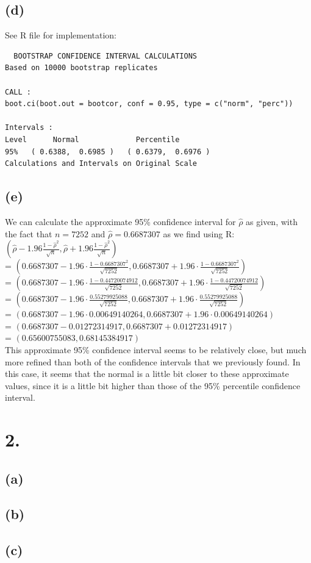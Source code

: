 \documentclass{article}
\begin{document}
{\subsection*{(d)}

See R file for implementation: \\ 
\begin{verbatim}
  BOOTSTRAP CONFIDENCE INTERVAL CALCULATIONS
Based on 10000 bootstrap replicates

CALL : 
boot.ci(boot.out = bootcor, conf = 0.95, type = c("norm", "perc"))

Intervals : 
Level      Normal             Percentile     
95%   ( 0.6388,  0.6985 )   ( 0.6379,  0.6976 )  
Calculations and Intervals on Original Scale
\end{verbatim}

\subsection*{(e)}

We can calculate the approximate 95\% confidence interval for $\hat{\rho}$ as given, with the fact that $n = 7252$ and $\hat{\rho} = 0.6687307$ as we find using R: \\
$(\hat{\rho} - 1.96 \frac{1 - \hat{\rho}^2}{\sqrt{n}}, \hat{\rho} + 1.96 \frac{1 - \hat{\rho}^2}{\sqrt{n}})$ \\
= $(0.6687307 - 1.96 \cdot \frac{1 - 0.6687307^2}{\sqrt{7252}}, 0.6687307 + 1.96 \cdot \frac{1 - 0.6687307^2}{\sqrt{7252}})$ \\
= $(0.6687307 - 1.96 \cdot \frac{1 - 0.44720074912}{\sqrt{7252}}, 0.6687307 + 1.96 \cdot \frac{1 - 0.44720074912}{\sqrt{7252}})$ \\
= $(0.6687307 - 1.96 \cdot \frac{0.55279925088}{\sqrt{7252}}, 0.6687307 + 1.96 \cdot \frac{0.55279925088}{\sqrt{7252}})$ \\
= $(0.6687307 - 1.96 \cdot 0.00649140264, 0.6687307 + 1.96 \cdot 0.00649140264)$ \\
= $(0.6687307 - 0.01272314917, 0.6687307 + 0.01272314917)$ \\
= $(0.65600755083, 0.68145384917)$ \\
This approximate 95\% confidence interval seems to be relatively close, but much more refined than both of the confidence intervals that we previously found. In this case, it seems that the normal is a little bit closer to these approximate values, since it is a little bit higher than those of the 95\% percentile confidence interval.

}

\section*{2.}
{\Large

\subsection*{(a)}



\subsection*{(b)}



\subsection*{(c)}



}
\end{document}
